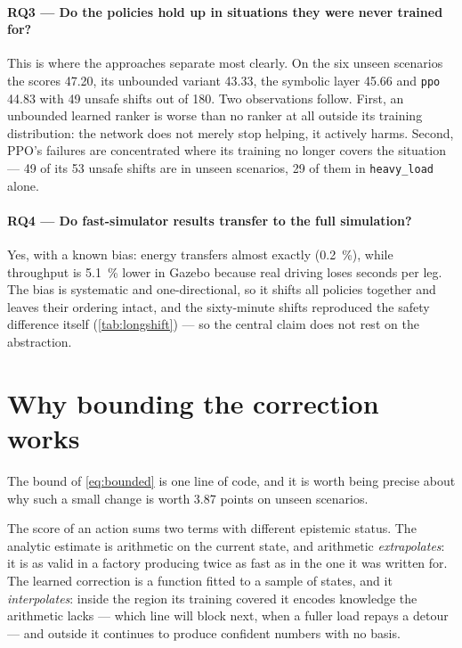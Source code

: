 \paragraph{RQ3 --- Do the policies hold up in situations they were never trained for?}
This is where the approaches separate most clearly. On the six unseen scenarios the \NS scores
\num{47.20}, its unbounded variant \num{43.33}, the symbolic layer \num{45.66} and \texttt{ppo}
\num{44.83} with \num{49} unsafe shifts out of \num{180}. Two observations follow. First, an
unbounded learned ranker is worse than no ranker at all outside its training distribution: the
network does not merely stop helping, it actively harms. Second, PPO's failures are concentrated
where its training no longer covers the situation --- \num{49} of its \num{53} unsafe shifts are in
unseen scenarios, \num{29} of them in \texttt{heavy\_load} alone.

\paragraph{RQ4 --- Do fast-simulator results transfer to the full simulation?}
Yes, with a known bias: energy transfers almost exactly (\SI{+0.2}{\percent}), while throughput is
\SI{5.1}{\percent} lower in Gazebo because real driving loses seconds per leg. The bias is
systematic and one-directional, so it shifts all policies together and leaves their ordering
intact, and the sixty-minute shifts reproduced the safety difference itself
(\cref{tab:longshift}) --- so the central claim does not rest on the abstraction.

\section{Why bounding the correction works}
\label{sec:why-bound}

The bound of \cref{eq:bounded} is one line of code, and it is worth being precise about why such a
small change is worth \num{3.87} points on unseen scenarios.

The score of an action sums two terms with different epistemic status. The analytic estimate is
arithmetic on the current state, and arithmetic \emph{extrapolates}: it is as valid in a factory
producing twice as fast as in the one it was written for. The learned correction is a function
fitted to a sample of states, and it \emph{interpolates}: inside the region its training covered it
encodes knowledge the arithmetic lacks --- which line will block next, when a fuller load repays a
detour --- and outside it continues to produce confident numbers with no basis.

